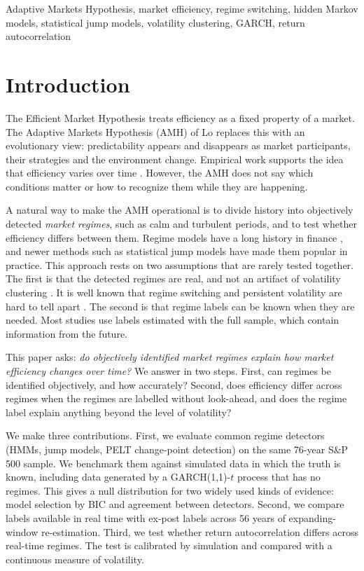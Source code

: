 \documentclass[conference]{IEEEtran}
\begin{document}
\begin{IEEEkeywords}
Adaptive Markets Hypothesis, market efficiency, regime switching, hidden Markov models, statistical jump models, volatility clustering, GARCH, return autocorrelation
\end{IEEEkeywords}

\section{Introduction}

The Efficient Market Hypothesis \cite{fama1970} treats efficiency as a fixed property of a market. The Adaptive Markets Hypothesis (AMH) of Lo \cite{lo2004, lo2017} replaces this with an evolutionary view: predictability appears and disappears as market participants, their strategies and the environment change. Empirical work supports the idea that efficiency varies over time \cite{limbrooks2011, kim2011, urquhart2013}. However, the AMH does not say which conditions matter or how to recognize them while they are happening.

A natural way to make the AMH operational is to divide history into objectively detected \emph{market regimes}, such as calm and turbulent periods, and to test whether efficiency differs between them. Regime models have a long history in finance \cite{hamilton1989, angtimmermann2012}, and newer methods such as statistical jump models \cite{nystrup2020, shu2024} have made them popular in practice. This approach rests on two assumptions that are rarely tested together. The first is that the detected regimes are real, and not an artifact of volatility clustering \cite{bollerslev1986}. It is well known that regime switching and persistent volatility are hard to tell apart \cite{lamoureux1990, hamiltonsusmel1994, gray1996, klaassen2002, diebold2001}. The second is that regime labels can be known when they are needed. Most studies use labels estimated with the full sample, which contain information from the future.

This paper asks: \emph{do objectively identified market regimes explain how market efficiency changes over time?} We answer in two steps. First, can regimes be identified objectively, and how accurately? Second, does efficiency differ across regimes when the regimes are labelled without look-ahead, and does the regime label explain anything beyond the level of volatility?

We make three contributions. First, we evaluate common regime detectors (HMMs, jump models, PELT change-point detection) on the same 76-year S\&P 500 sample. We benchmark them against simulated data in which the truth is known, including data generated by a GARCH(1,1)-$t$ process that has no regimes. This gives a null distribution for two widely used kinds of evidence: model selection by BIC and agreement between detectors. Second, we compare labels available in real time with ex-post labels across 56 years of expanding-window re-estimation. Third, we test whether return autocorrelation differs across real-time regimes. The test is calibrated by simulation and compared with a continuous measure of volatility.
\end{document}
